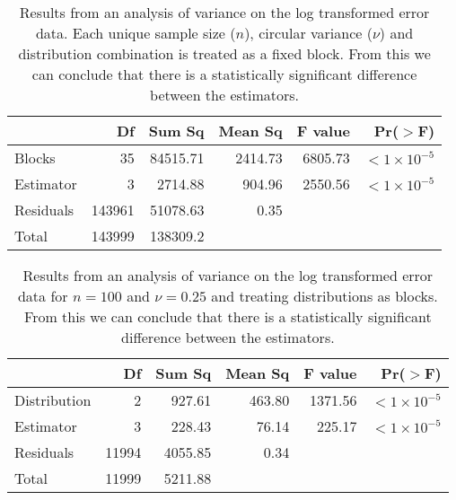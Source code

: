 \begin{table}[h!]
\caption{Results from an analysis of variance on the log transformed error data.  Each unique sample size ($n$), circular variance ($\nu$) and distribution combination is treated as a fixed block.  From this we can conclude that there is a statistically significant difference between the estimators.}
\begin{center}
\begin{tabular}{lrrrrr}
  \hline
 & Df & Sum Sq & Mean Sq & F value & Pr($>$F) \\ 
  \hline
Blocks      & 35 & 84515.71 & 2414.73 & 6805.73 & $<1\times 10^{-5}$ \\ 
Estimator   & 3 & 2714.88 & 904.96 & 2550.56 & $<1\times 10^{-5}$ \\ 
Residuals   & 143961 & 51078.63 & 0.35 &  &  \\ \hline
Total & 143999 & 138309.2&&&\\
   \hline
\end{tabular}
\end{center}
\end{table}

\begin{table}[h!]
\caption{Results from an analysis of variance on the log transformed error data for $n=100$ and $\nu=0.25$ and treating distributions as blocks.  From this we can conclude that there is a statistically significant difference between the estimators.}
\begin{center}
\begin{tabular}{lrrrrr}
  \hline
 & Df & Sum Sq & Mean Sq & F value & Pr($>$F) \\ 
  \hline
Distribution       & 2 & 927.61 & 463.80 & 1371.56 & $<1\times 10^{-5}$ \\ 
Estimator   & 3 & 228.43 & 76.14 & 225.17 & $<1\times 10^{-5}$ \\ 
Residuals   & 11994 & 4055.85 & 0.34 &  &  \\
Total & 11999 & 5211.88 &&&\\
   \hline
\end{tabular}
\end{center}
\end{table}
